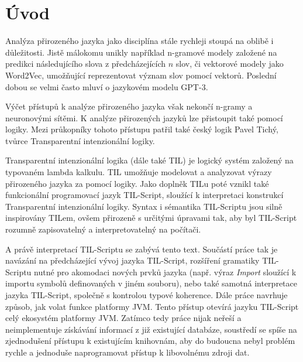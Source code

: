 \chapter{Úvod}
\label{sec:Introduction}


Analýza přirozeného jazyka jako disciplína stále rychleji stoupá na oblibě i důležitosti. Jistě
málokomu unikly například n-gramové modely založené na predikci následujícího slova
z předcházejících $n$ slov, či vektorové modely jako Word2Vec, umožňující reprezentovat význam
slov pomocí vektorů. Poslední dobou se velmi často mluví o jazykovém modelu GPT-3.

Výčet přístupů k analýze přirozeného jazyka však nekončí n-gramy a neuronovými sítěmi. K analýze
přirozených jazyků lze přistoupit také pomocí logiky. Mezi průkopníky tohoto přístupu patřil také
český logik Pavel Tichý, tvůrce Transparentní intenzionální logiky.

Transparentní intenzionální logika (dále také TIL) je logický systém založený na typovaném lambda
kalkulu. TIL umožňuje modelovat a analyzovat výrazy přirozeného jazyka za pomocí logiky. Jako
doplněk TILu poté vznikl také funkcionální programovací jazyk TIL-Script, sloužící k interpretaci
konstrukcí Transparentní intenzionální logiky. Syntax i sémantika TIL-Scriptu jsou silně inspirovány
TILem, ovšem přirozeně s určitými úpravami tak, aby byl TIL-Script rozumně zapisovatelný
a interpretovatelný na počítači.

A právě interpretací TIL-Scriptu se zabývá tento text. Součástí práce tak je navázání
na předcházející vývoj jazyka TIL-Script, rozšíření gramatiky TIL-Scriptu nutné pro akomodaci nových
prvků jazyka (např. výraz \textit{Import} sloužící k importu symbolů definovaných v jiném
souboru), nebo také samotná interpretace jazyka TIL-Script, společně s kontrolou typové koherence.
Dále práce navrhuje způsob, jak volat funkce platformy JVM. Tento přístup otevírá jazyku TIL-Script
celý ekosystém platformy JVM. Zatímco tedy práce nijak neřeší a neimplementuje získávání informací
z již existující databáze, soustředí se spíše na zjednodušení přístupu k existujícím knihovnám, aby
do budoucna nebyl problém rychle a jednoduše naprogramovat přístup k libovolnému zdroji dat.

